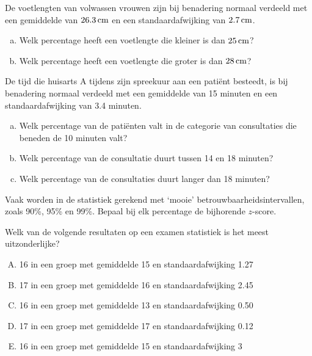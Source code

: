 \documentclass[12pt,twoside,a4paper]{article}
\begin{document}
\begin{oefening}
De voetlengten van volwassen vrouwen zijn bij benadering normaal verdeeld met een gemiddelde van $26.3 \cm$ en een standaardafwijking van $2.7 \cm$.
\begin{enumerate}[(a)]
  \item Welk percentage heeft een voetlengte die kleiner is dan $25 \cm$?
  \item Welk percentage heeft een voetlengte die groter is dan $28 \cm$?
\end{enumerate}
\end{oefening}

\begin{oefening}
De tijd die huisarts A tijdens zijn spreekuur aan een patiënt besteedt, is bij benadering normaal verdeeld met een gemiddelde van 15 minuten en een standaardafwijking van 3.4 minuten.
\begin{enumerate}[(a)]
  \item Welk percentage van de patiënten valt in de categorie van consultaties die beneden de 10 minuten valt?
  \item Welk percentage van de consultatie duurt tussen 14 en 18 minuten?
  \item Welk percentage van de consultaties duurt langer dan 18 minuten?
\end{enumerate}
\end{oefening}

\begin{oefening}
Vaak worden in de statistiek gerekend met ‘mooie’ betrouwbaarheidsintervallen, zoals 90\%, 95\% en 99\%. Bepaal bij elk percentage de bijhorende $z$-score.
\end{oefening}

\begin{oefening}
Welk van de volgende resultaten op een examen statistiek is het meest uitzonderlijke?
\begin{enumerate}[(A)]
  \item 16 in een groep met gemiddelde 15 en standaardafwijking 1.27
  \item 17 in een groep met gemiddelde 16 en standaardafwijking 2.45
  \item 16 in een groep met gemiddelde 13 en standaardafwijking 0.50
  \item 17 in een groep met gemiddelde 17 en standaardafwijking 0.12
  \item 16 in een groep met gemiddelde 15 en standaardafwijking 3
\end{enumerate}
\end{oefening}
\end{document}
